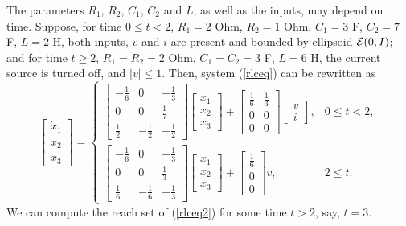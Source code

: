 \documentclass{report}
\newcommand{\EE}{{\cal E}}
\begin{document}
The parameters $R_1$, $R_2$, $C_1$, $C_2$ and $L$, as well as the inputs,
may depend on time. Suppose, for time $0\leq t<2$, $R_1=2$ Ohm, $R_2=1$ Ohm,
$C_1=3$ F, $C_2=7$ F, $L=2$ H, both inputs, $v$ and $i$ are present and
bounded by ellipsoid $\EE(0,I)$; and for time $t\geq 2$,
$R_1=R_2=2$ Ohm, $C_1=C_2=3$ F, $L=6$ H, the current source is turned off,
and $|v|\leq 1$. Then, system (\ref{rlceq}) can be rewritten as
\begin{equation}
\left[\begin{array}{c}
\dot{x}_1\\
\dot{x}_2\\
\dot{x}_3\end{array}\right] = \left\{\begin{array}{ll}
\left[\begin{array}{ccc}
-\frac{1}{6} & 0 & -\frac{1}{3}\\
0 & 0 & \frac{1}{7}\\
\frac{1}{2} & -\frac{1}{2} & -\frac{1}{2}\end{array}\right]
\left[\begin{array}{c}
x_1\\
x_2\\
x_3\end{array}\right] + \left[\begin{array}{cc}
\frac{1}{6} & \frac{1}{3}\\
0 & 0\\
0 & 0\end{array}\right]\left[\begin{array}{c}
v\\
i\end{array}\right], & 0\leq t< 2, \\
\left[\begin{array}{ccc}
-\frac{1}{6} & 0 & -\frac{1}{3}\\
0 & 0 & \frac{1}{3}\\
\frac{1}{6} & -\frac{1}{6} & -\frac{1}{3}\end{array}\right]
\left[\begin{array}{c}
x_1\\
x_2\\
x_3\end{array}\right] + \left[\begin{array}{c}
\frac{1}{6} \\
0 \\
0 \end{array}\right]v, & 2\leq t. \end{array}\right.
\label{rlceq2}
\end{equation}
We can compute the reach set of (\ref{rlceq2}) for some time $t>2$, say, $t=3$.
\end{document}
